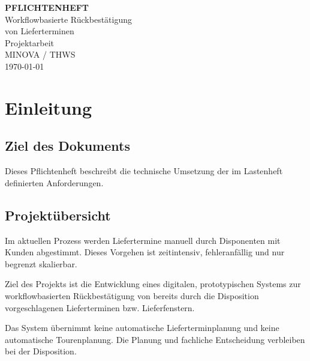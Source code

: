 \documentclass[12pt,a4paper]{article}
\begin{document}
\begin{titlepage}
    \centering

    \vspace*{3cm}

    {\Huge \textbf{PFLICHTENHEFT}}\\[1.5cm]

    {\LARGE Workflowbasierte Rückbestätigung}\\[0.3cm]
    {\LARGE von Lieferterminen}\\[3cm]

    {\Large Projektarbeit}\\[2cm]

    {\large
    MINOVA / THWS
    }\\[1cm]

    {\large
    \today
    }

    \vfill

\end{titlepage}

\tableofcontents
\newpage

\section{Einleitung}
\subsection{Ziel des Dokuments}
Dieses Pflichtenheft beschreibt die technische Umsetzung der im Lastenheft definierten Anforderungen.

\subsection{Projektübersicht}

Im aktuellen Prozess werden Liefertermine manuell durch Disponenten mit Kunden abgestimmt. 
Dieses Vorgehen ist zeitintensiv, fehleranfällig und nur begrenzt skalierbar.

Ziel des Projekts ist die Entwicklung eines digitalen, prototypischen Systems zur workflowbasierten Rückbestätigung von bereits durch die Disposition vorgeschlagenen Lieferterminen bzw. Lieferfenstern.

Das System übernimmt keine automatische Lieferterminplanung und keine automatische Tourenplanung. 
Die Planung und fachliche Entscheidung verbleiben bei der Disposition.
\end{document}
